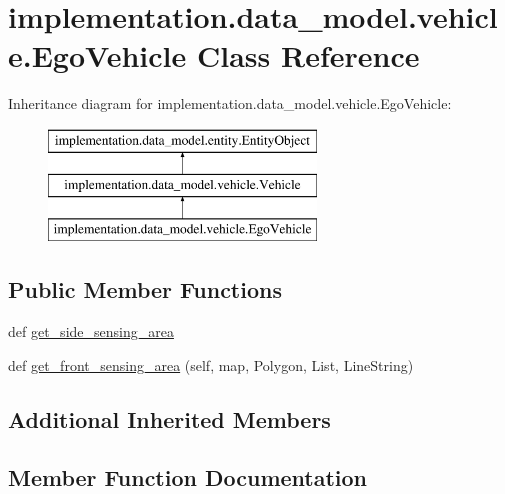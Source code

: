 \hypertarget{classimplementation_1_1data__model_1_1vehicle_1_1_ego_vehicle}{}\section{implementation.\+data\+\_\+model.\+vehicle.\+Ego\+Vehicle Class Reference}
\label{classimplementation_1_1data__model_1_1vehicle_1_1_ego_vehicle}
Inheritance diagram for implementation.\+data\+\_\+model.\+vehicle.\+Ego\+Vehicle\+:\begin{figure}[H]
\begin{center}
\leavevmode
\includegraphics[height=3.000000cm]{classimplementation_1_1data__model_1_1vehicle_1_1_ego_vehicle}
\end{center}
\end{figure}
\subsection*{Public Member Functions}
\begin{DoxyCompactItemize}
\item 
def \hyperlink{classimplementation_1_1data__model_1_1vehicle_1_1_ego_vehicle_ad8165c0170e23589f0c6279ba4f7375d}{get\+\_\+side\+\_\+sensing\+\_\+area}
\item 
def \hyperlink{classimplementation_1_1data__model_1_1vehicle_1_1_ego_vehicle_acf6215a9d5f680822306f8dc785764f5}{get\+\_\+front\+\_\+sensing\+\_\+area} (self, map, Polygon, List, Line\+String)
\end{DoxyCompactItemize}
\subsection*{Additional Inherited Members}


\subsection{Member Function Documentation}
\mbox{\label{classimplementation_1_1data__model_1_1vehicle_1_1_ego_vehicle_acf6215a9d5f680822306f8dc785764f5}} 
